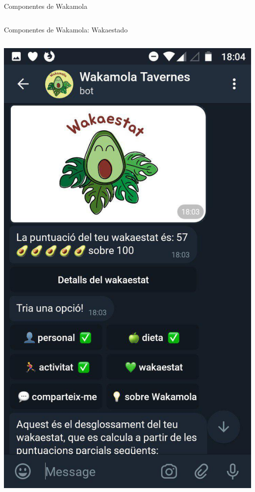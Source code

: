 \documentclass[bigger]{beamer}
\begin{document}
\begin{frame}{Componentes de Wakamola}
\begin{columns}[T]
\begin{column}[T]{6cm}
		\end{column}
	\end{columns}
 \end{frame}

\begin{frame}{Componentes de Wakamola: Wakaestado}
	\begin{columns}[T]
		\begin{column}[T]{6cm}
		\centering
		\includegraphics[scale=0.16]{img/wakaestado}
		\end{column}

\end{columns}
\end{frame}
\end{document}
